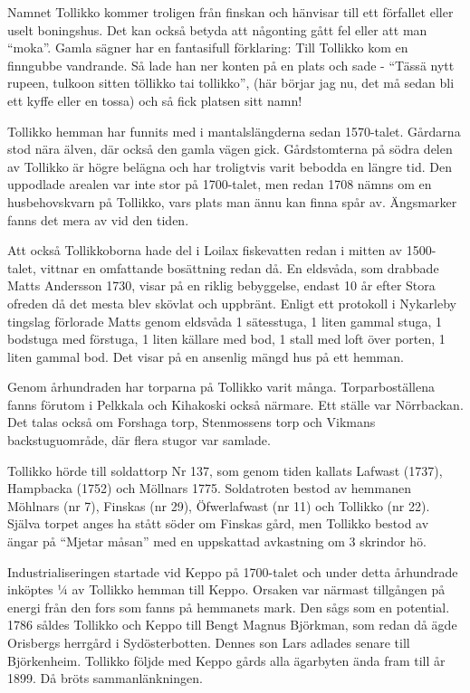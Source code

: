 %

Namnet Tollikko kommer troligen från finskan och hänvisar till ett förfallet eller uselt boningshus. Det kan också betyda att någonting gått fel eller att man ``moka''. Gamla sägner har en  fantasifull förklaring: Till Tollikko kom en finngubbe vandrande. Så lade han ner konten på en plats och sade - ``Tässä nytt rupeen, tulkoon sitten töllikko tai tollikko'', (här börjar jag nu, det må sedan bli ett kyffe eller en tossa) och så fick platsen sitt namn!

Tollikko hemman har funnits med i mantalslängderna sedan 1570-talet. Gårdarna stod nära älven, där också den gamla vägen gick. Gårdstomterna på södra delen av Tollikko är högre belägna och har troligtvis varit bebodda en längre tid. Den uppodlade arealen var inte stor på 1700-talet, men redan 1708 nämns om en husbehovskvarn på Tollikko, vars plats man ännu kan finna spår av. Ängsmarker fanns det mera av vid den tiden.

Att också Tollikkoborna hade del i Loilax fiskevatten redan i mitten av 1500-talet, vittnar en omfattande bosättning redan då. En eldsvåda, som drabbade Matts Andersson 1730, visar på en riklig bebyggelse, endast 10 år efter Stora ofreden då det mesta blev skövlat och uppbränt. Enligt ett protokoll i Nykarleby tingslag förlorade Matts genom eldsvåda 1 sätesstuga, 1 liten gammal stuga, 1 bodstuga med förstuga, 1 liten källare med bod, 1 stall med loft över porten, 1 liten gammal bod. Det visar på en ansenlig mängd hus på ett hemman.

Genom århundraden har torparna på Tollikko varit många. Torparboställena fanns förutom i Pelkkala och Kihakoski också närmare. Ett ställe var Nörrbackan. Det talas också om Forshaga torp, Stenmossens torp och Vikmans backstuguområde, där flera stugor var samlade.

Tollikko hörde till soldattorp Nr 137, som genom tiden kallats Lafwast (1737), Hampbacka (1752) och Möllnars 1775. Soldatroten bestod av hemmanen Möhlnars (nr 7), Finskas (nr 29), Öfwerlafwast (nr 11) och Tollikko (nr 22). Själva torpet anges ha stått söder om Finskas gård, men Tollikko bestod av ängar på ``Mjetar måsan'' med en uppskattad avkastning om 3 skrindor hö.

Industrialiseringen startade vid Keppo på 1700-talet och under detta århundrade inköptes ¼ av Tollikko hemman till Keppo. Orsaken var närmast tillgången på energi från den fors som fanns på hemmanets mark. Den sågs som en potential. 1786 såldes Tollikko och Keppo till Bengt Magnus Björkman, som redan då ägde Orisbergs herrgård i Sydösterbotten. Dennes son Lars adlades senare till Björkenheim. Tollikko följde med Keppo gårds alla ägarbyten ända fram till år 1899. Då bröts sammanlänkningen.

